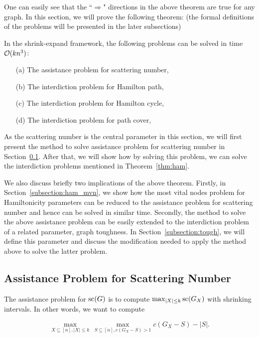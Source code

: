 One can easily see that the ``$\Rightarrow$" directions in the above theorem are true for any graph. In this section, we will prove the following theorem: (the formal definitions of the problems will be presented in the later subsections)

\begin{theorem}
\label{thm:ham}
In the shrink-expand framework, the following problems can be solved in time $\mathcal{O}(kn^3)$:
\begin{itemize}
	\item[(a)] The assistance problem for scattering number,
	\item[(b)] The interdiction problem for Hamilton path,
	\item[(c)] The interdiction problem for Hamilton cycle,
	\item[(d)] The interdiction problem for path cover,
\end{itemize}
\end{theorem}

As the scattering number is the central parameter in this section, we will first present the method to solve  assistance problem for scattering number in Section~\ref{subsection:scat}.
After that, we will show how by solving this problem, we can solve the interdiction problems mentioned in Theorem~\ref{thm:ham}.

We also discuss briefly two implications of the above theorem. 
Firstly, in Section~\ref{subsection:ham_mvn}, we show how the most vital nodes problem for Hamiltonicity parameters can be reduced to the assistance problem for scattering number and hence can be solved in similar time. 
Secondly, the method to solve the above assistance problem can be easily extended to the interdiction problem of a related parameter, graph toughness. 
In Section~\ref{subsection:tough}, we will define this parameter and discuss the modification needed to apply the method above to solve the latter problem. 

\subsection{Assistance Problem for Scattering Number}
\label{subsection:scat}

The assistance problem for $\text{sc}(G)$ is to compute $\max_{|X| \leq k}\text{sc}(G_X)$ with shrinking intervals. 
In other words, we want to compute 

\begin{equation}
\label{eq:scat_assist}
  \max_{X \subseteq [n], |X| \leq k} \, \max_{S \subseteq [n], c(G_X - S) > 1} c(G_X - S) - |S|.
\end{equation}

